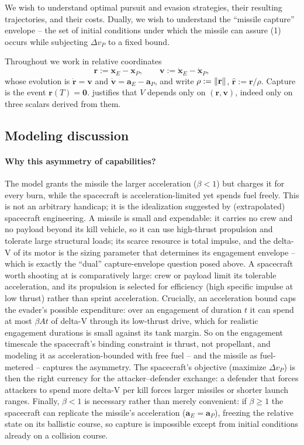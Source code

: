 \documentclass{article}
\newcommand{\eqdef}{:=}
\renewcommand{\vec}[1]{\mathbf{#1}}
\theoremstyle{remark}
\begin{document}
We wish to understand optimal pursuit and evasion strategies, their resulting
trajectories, and their costs.  Dually, we wish to understand the ``missile
capture'' envelope -- the set of initial conditions under which the missile can
assure (1) occurs while subjecting $\Delta v_P$ to a fixed bound.

Throughout we work in relative coordinates
\begin{equation}
  \vec{r} \eqdef \vec{x}_E - \vec{x}_P, \qquad
  \vec{v} \eqdef \dot{\vec{x}}_E - \dot{\vec{x}}_P,
\end{equation}
whose evolution is $\dot{\vec r} = \vec v$ and
$\dot{\vec v} = \vec a_E - \vec a_P$, and write
$\rho \eqdef \norm{\vec{r}}$, $\hat{\vec{r}} \eqdef \vec{r}/\rho$.
Capture is the event $\vec{r}(T) = \vec{0}$.   justifies
that $V$ depends only on $(\vec r, \vec v)$, indeed only on three scalars
derived from them.

\subsection{Modeling discussion}
\label{sec:modeling}

\paragraph{Why this asymmetry of capabilities?}
The model grants the missile the larger acceleration ($\beta < 1$) but
charges it for every burn, while the spacecraft is acceleration-limited yet
spends fuel freely.  This is not an arbitrary handicap; it is the idealization
suggested by (extrapolated) spacecraft engineering.  A missile is small and
expendable: it carries no crew and no payload beyond its kill vehicle, so it
can use high-thrust propulsion and tolerate large structural loads; its
scarce resource is total impulse, and the delta-V of its motor is the sizing
parameter that determines its engagement envelope -- which is exactly the
``dual'' capture-envelope question posed above.  A spacecraft worth shooting
at is comparatively large: crew or payload limit its tolerable acceleration,
and its propulsion is selected for efficiency (high specific impulse at low
thrust) rather than sprint acceleration.  Crucially, an acceleration bound
caps the evader's possible expenditure: over an engagement of duration $t$ it
can spend at most $\beta A t$ of delta-V through its low-thrust drive, which
for realistic engagement durations is small against its tank margin.  So on
the engagement timescale the spacecraft's binding constraint is thrust, not
propellant, and modeling it as acceleration-bounded with free fuel -- and the
missile as fuel-metered -- captures the asymmetry.  The spacecraft's
objective (maximize $\Delta v_P$) is then the right currency for the
attacker--defender exchange: a defender that forces attackers to spend more
delta-V per kill forces larger missiles or shorter launch ranges.  Finally,
$\beta < 1$ is necessary rather than merely convenient: if $\beta \ge 1$ the
spacecraft can replicate the missile's acceleration ($\vec a_E = \vec a_P$),
freezing the relative state on its ballistic course, so capture is
impossible except from initial conditions already on a collision course.
\end{document}
